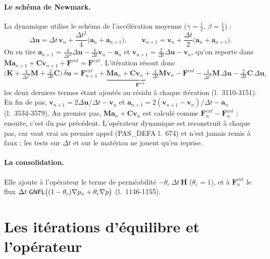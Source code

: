 \documentclass[11pt,a4paper]{article}
\numberwithin{equation}{section}
\newcommand{\src}[1]{\texttt{\detokenize{#1}}}          %
\newcommand{\pr}[1]{\textsf{#1}}                        %
\newcommand{\op}[1]{\textsf{\small #1}}                 %
\newcommand{\lig}[1]{l.~#1}
\newcommand{\vc}[1]{\symbf{#1}}                         %
\begin{document}
\paragraph{Le schéma de Newmark.}
La dynamique utilise le schéma de l'accélération moyenne ($\gamma = \tfrac12$, $\beta = \tfrac14$) :
\begin{equation}
\Delta\vc u = \Delta t\,\vc v_n + \frac{\Delta t^2}{4}\big(\vc a_n + \vc a_{n+1}\big),\qquad
\vc v_{n+1} = \vc v_n + \frac{\Delta t}{2}\big(\vc a_n + \vc a_{n+1}\big).
\end{equation}
On en tire $\vc a_{n+1} = \tfrac{4}{\Delta t^2}\Delta\vc u - \tfrac4{\Delta t}\vc v_n - \vc a_n$ et $\vc v_{n+1} = \tfrac2{\Delta t}\Delta\vc u - \vc v_n$, qu'on reporte dans $\vc M\vc a_{n+1} + \vc C\vc v_{n+1} + \vc F^{int} = \vc F^{ext}$.
L'itération résout donc
\begin{equation}
\Big(\vc K + \tfrac{4}{\Delta t^{2}}\vc M + \tfrac{2}{\Delta t}\vc C\Big)\,\delta\vc u
= \vc F^{ext}_{n+1} + \underbrace{\vc M\vc a_n + \vc C\vc v_n + \tfrac{4}{\Delta t}\vc M\vc v_n}_{\vc F^{rea}}
- \vc F^{int} - \tfrac{4}{\Delta t^{2}}\vc M\,\Delta\vc u - \tfrac{2}{\Delta t}\vc C\,\Delta\vc u ,
\end{equation}
les deux derniers termes étant ajoutés au résidu à chaque itération (\lig{3110-3151}).
En fin de pas, $\vc v_{n+1} = 2\Delta\vc u/\Delta t - \vc v_n$ et $\vc a_{n+1} = 2(\vc v_{n+1} - \vc v_n)/\Delta t - \vc a_n$ (\lig{3534-3579}).
Au premier pas, $\vc M\vc a_n + \vc C\vc v_n$ est calculé comme $\vc F^{ext}_n - \vc F^{int}_n$ ; ensuite, c'est \src{FOPL} du pas précédent.
L'opérateur dynamique est reconstruit à chaque pas, car \src{RECAOP} vaut vrai au premier appel (\pr{PAS\_DEFA} \lig{674}) et n'est jamais remis à faux ; les tests sur $\Delta t$ et sur le matériau ne jouent qu'en reprise.

\paragraph{La consolidation.}
Elle ajoute à l'opérateur le terme de perméabilité $-\theta_c\,\Delta t\,\vc H$ ($\theta_c = 1$), et à $\vc F^{int}_n$ le flux $\Delta t\;\op{GNFL}\big((1-\theta_c)\nabla p_n + \theta_c\nabla p\big)$ (\lig{1146-1155}).
\section{Les itérations d'équilibre et l'opérateur}
\label{sec:iterations}
\end{document}
